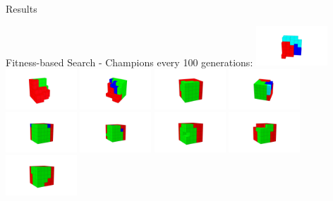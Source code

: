 \documentclass{beamer}
\begin{document}
\begin{frame}[allowframebreaks]{Results}
\begin{minipage}{\textwidth}
\begin{block}{Fitness-based Search - Champions every 100 generations:}
\includegraphics[width=0.2\textwidth]{figures/Robots/f_3_g_100.jpg}
\includegraphics[width=0.2\textwidth]{figures/Robots/f_3_g_200.jpg}
\includegraphics[width=0.2\textwidth]{figures/Robots/f_3_g_300.jpg}
\includegraphics[width=0.2\textwidth]{figures/Robots/f_3_g_400.jpg}
\includegraphics[width=0.2\textwidth]{figures/Robots/f_3_g_500.jpg}\\
\includegraphics[width=0.2\textwidth]{figures/Robots/f_3_g_600.jpg}
\includegraphics[width=0.2\textwidth]{figures/Robots/f_3_g_700.jpg}
\includegraphics[width=0.2\textwidth]{figures/Robots/f_3_g_800.jpg}
\includegraphics[width=0.2\textwidth]{figures/Robots/f_3_g_900.jpg}
\includegraphics[width=0.2\textwidth]{figures/Robots/f_3_g_1000.jpg}
\end{block}
\end{minipage}


\end{frame}
\end{document}
